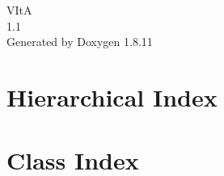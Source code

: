 \documentclass[twoside]{book}
\newcommand{\+}{\discretionary{\mbox{\scriptsize$\hookleftarrow$}}{}{}}
\newcommand{\clearemptydoublepage}{%
  \newpage{\pagestyle{empty}\cleardoublepage}%
}
\begin{document}
\hypersetup{pageanchor=false,
             bookmarksnumbered=true,
             pdfencoding=unicode
            }
\begin{titlepage}
\vspace*{7cm}
\begin{center}%
{\Large V\+ItA \\[1ex]\large 1.\+1 }\\
\vspace*{1cm}
{\large Generated by Doxygen 1.8.11}\\
\end{center}
\end{titlepage}
\clearemptydoublepage
\tableofcontents
\clearemptydoublepage
{}
\hypersetup{pageanchor=true}

\chapter{Hierarchical Index}

\chapter{Class Index}

\end{document}
